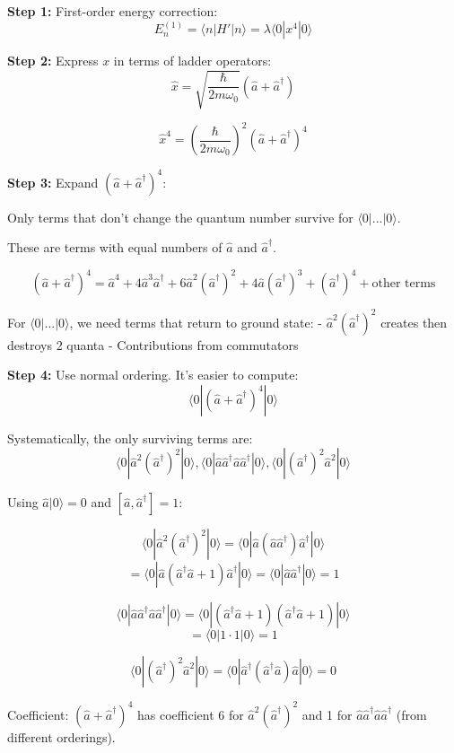 \documentclass[12pt,a4paper]{article}
\begin{document}
\begin{solution}
\textbf{Step 1:} First-order energy correction:
$$E_n^{(1)} = \langle n|H'|n\rangle = \lambda\langle 0|x^4|0\rangle$$

\textbf{Step 2:} Express $x$ in terms of ladder operators:
$$\hat{x} = \sqrt{\frac{\hbar}{2m\omega_0}}(\hat{a} + \hat{a}^\dagger)$$

$$\hat{x}^4 = \left(\frac{\hbar}{2m\omega_0}\right)^2(\hat{a} + \hat{a}^\dagger)^4$$

\textbf{Step 3:} Expand $(\hat{a} + \hat{a}^\dagger)^4$:

Only terms that don't change the quantum number survive for $\langle 0|...|0\rangle$.

These are terms with equal numbers of $\hat{a}$ and $\hat{a}^\dagger$.

$$(\hat{a} + \hat{a}^\dagger)^4 = \hat{a}^4 + 4\hat{a}^3\hat{a}^\dagger + 6\hat{a}^2(\hat{a}^\dagger)^2 + 4\hat{a}(\hat{a}^\dagger)^3 + (\hat{a}^\dagger)^4 + \text{other terms}$$

For $\langle 0|...|0\rangle$, we need terms that return to ground state:
- $\hat{a}^2(\hat{a}^\dagger)^2$ creates then destroys 2 quanta
- Contributions from commutators

\textbf{Step 4:} Use normal ordering. It's easier to compute:
$$\langle 0|(\hat{a} + \hat{a}^\dagger)^4|0\rangle$$

Systematically, the only surviving terms are:
$$\langle 0|\hat{a}^2(\hat{a}^\dagger)^2|0\rangle, \langle 0|\hat{a}\hat{a}^\dagger\hat{a}\hat{a}^\dagger|0\rangle, \langle 0|(\hat{a}^\dagger)^2\hat{a}^2|0\rangle$$

Using $\hat{a}|0\rangle = 0$ and $[\hat{a}, \hat{a}^\dagger] = 1$:

$$\langle 0|\hat{a}^2(\hat{a}^\dagger)^2|0\rangle = \langle 0|\hat{a}(\hat{a}\hat{a}^\dagger)\hat{a}^\dagger|0\rangle$$
$$= \langle 0|\hat{a}(\hat{a}^\dagger\hat{a} + 1)\hat{a}^\dagger|0\rangle = \langle 0|\hat{a}\hat{a}^\dagger|0\rangle = 1$$

$$\langle 0|\hat{a}\hat{a}^\dagger\hat{a}\hat{a}^\dagger|0\rangle = \langle 0|(\hat{a}^\dagger\hat{a} + 1)(\hat{a}^\dagger\hat{a} + 1)|0\rangle$$
$$= \langle 0|1 \cdot 1|0\rangle = 1$$

$$\langle 0|(\hat{a}^\dagger)^2\hat{a}^2|0\rangle = \langle 0|\hat{a}^\dagger(\hat{a}^\dagger\hat{a})\hat{a}|0\rangle = 0$$

Coefficient: $(\hat{a} + \hat{a}^\dagger)^4$ has coefficient 6 for $\hat{a}^2(\hat{a}^\dagger)^2$ and 1 for $\hat{a}\hat{a}^\dagger\hat{a}\hat{a}^\dagger$ (from different orderings).


\end{solution}
\end{document}
